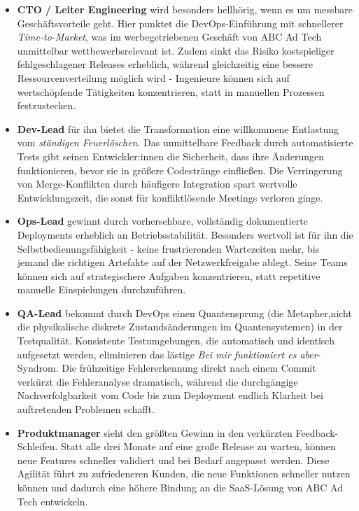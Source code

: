 \begin{itemize}
    \item \textbf{CTO / Leiter Engineering} wird besonders hellhörig, wenn es um messbare Geschäftsvorteile geht.
    Hier punktet die DevOps-Einführung mit schnellerer \textit{Time-to-Market}, was im werbegetriebenen Geschäft von ABC
    Ad Tech unmittelbar wettbewerbsrelevant ist. Zudem sinkt das Risiko kostspieliger fehlgeschlagener Releases erheblich,
    während gleichzeitig eine bessere Ressourcenverteilung möglich wird - Ingenieure können sich auf wertschöpfende Tätigkeiten konzentrieren,
    statt in manuellen Prozessen festzustecken.
    \item \textbf{Dev-Lead} für ihn bietet die Transformation eine willkommene Entlastung vom \textit{ständigen Feuerlöschen}.
    Das unmittelbare Feedback durch automatisierte Tests gibt seinen Entwickler:innen die Sicherheit, dass ihre Änderungen funktionieren,
    bevor sie in größere Codestränge einfließen. Die Verringerung von Merge-Konflikten durch häufigere Integration spart wertvolle Entwicklungszeit,
    die sonst für konfliktlösende Meetings verloren ginge.
    \item \textbf{Ops-Lead} gewinnt durch vorhersehbare, vollständig dokumentierte Deployments erheblich an Betriebsstabilität.
    Besonders wertvoll ist für ihn die Selbstbedienungsfähigkeit - keine frustrierenden Wartezeiten mehr,
    bis jemand die richtigen Artefakte auf der Netzwerkfreigabe ablegt. Seine Teams können sich auf strategischere Aufgaben konzentrieren,
    statt repetitive manuelle Einspielungen durchzuführen.
    \item \textbf{QA-Lead} bekommt durch DevOps einen Quantensprung
    (die Metapher,nicht die physikalische diskrete Zustandsänderungen im Quantensystemen) in der Testqualität.
    Konsistente Testumgebungen, die automatisch und identisch aufgesetzt werden, eliminieren das
    lästige \textit{Bei mir funktioniert es aber}-Syndrom. Die frühzeitige Fehlererkennung direkt nach einem Commit
    verkürzt die Fehleranalyse dramatisch, während die durchgängige Nachverfolgbarkeit vom Code bis zum Deployment endlich Klarheit bei
    auftretenden Problemen schafft.
    \item \textbf{Produktmanager } sieht den größten Gewinn in den verkürzten Feedback-Schleifen.
    Statt alle drei Monate auf eine große Release zu warten, können neue Features schneller validiert und bei Bedarf angepasst werden.
    Diese Agilität führt zu zufriedeneren Kunden, die neue Funktionen schneller nutzen können
    und dadurch eine höhere Bindung an die SaaS-Lösung von ABC Ad Tech entwickeln.
\end{itemize}

